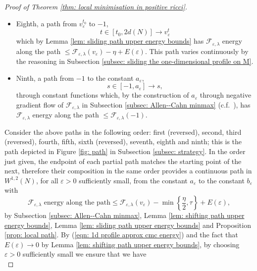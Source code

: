 \documentclass[11pt]{article}
\begin{document}
\begin{proof}[Proof of Theorem \ref{thm: local minimisation in positive ricci}]
\begin{itemize}
    \item Eighth, a path from $v^{t_0}_\varepsilon$ to $-1$,
    \begin{equation*}
    t \in [t_0,2d(N)] \rightarrow v^t_\varepsilon
    \end{equation*}
    which by Lemma \ref{lem: sliding path upper energy bounds} has $\mathcal{F}_{\varepsilon,\lambda}$ energy along the path $\leq \mathcal{F}_{\varepsilon,\lambda}(v_\varepsilon) - \eta + E(\varepsilon)$. This path varies continuously by the reasoning in Subsection \ref{subsec: sliding the one-dimensional profile on M}.

    \item Ninth, a path from $-1$ to the constant $a_\varepsilon$,
    \begin{equation*}
        s \in [-1,a_\varepsilon] \rightarrow s,
    \end{equation*}
    through constant functions which, by the construction of $a_\varepsilon$ through negative gradient flow of $\mathcal{F}_{\varepsilon,\lambda}$ in Subsection \ref{subsec: Allen--Cahn minmax} (c.f.~\cite[Section 5]{bellettini-wickramasekera}), has $\mathcal{F}_{\varepsilon,\lambda}$ energy along the path $\leq \mathcal{F}_{\varepsilon,\lambda}(-1)$.
\end{itemize}
Consider the above paths in the following order: first (reversed), second, third (reversed), fourth, fifth, sixth (reversed), seventh, eighth and ninth; this is the path depicted in Figure \ref{fig: path} in Subsection \ref{subsec: strategy}. In the order just given, the endpoint of each partial path matches the starting point of
the next, therefore their composition in the same order provides a continuous path
in $W^{1,2}(N)$, for all $\varepsilon > 0$ sufficiently small, from the constant $a_\varepsilon$ to the constant $b_\varepsilon$ with
\begin{equation*}
    \text{$\mathcal{F}_{\varepsilon,\lambda}$ energy along the path} \leq \mathcal{F}_{\varepsilon,\lambda}(v_\varepsilon) - \min\left\{\frac{\eta}{2},\tau \right\} + E(\varepsilon),
\end{equation*}
by Subsection \ref{subsec: Allen--Cahn minmax}, Lemma \ref{lem: shifting path upper energy bounds}, Lemma \ref{lem: sliding path upper energy bounds} and Proposition \ref{prop: local path}. By (\ref{eqn: 1d profile approx cmc energy}) and the fact that $E(\varepsilon) \rightarrow 0$ by Lemma \ref{lem: shifting path upper energy bounds}, by choosing  $\varepsilon > 0$ sufficiently small we ensure that we have
\begin{equation*}

\end{equation*}
\end{proof}
\end{document}
